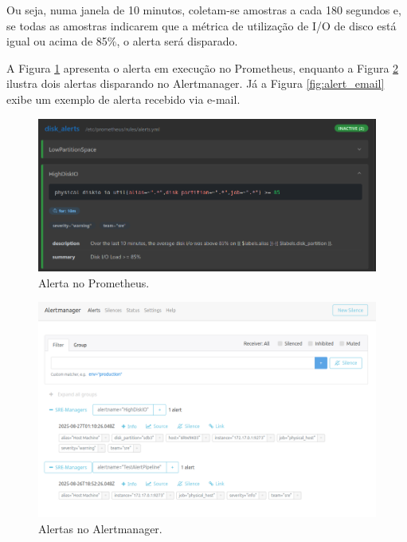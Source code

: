 {Ou seja, numa janela de 10 minutos, coletam-se amostras a cada 180 segundos e, se todas as amostras indicarem que a métrica de utilização de I/O de disco está igual ou acima de 85\%, o alerta será disparado.

A Figura \ref{fig:alert_prometheus} apresenta o alerta em execução no Prometheus, enquanto a Figura \ref{fig:alert_alertmanager} ilustra dois alertas disparando no Alertmanager. Já a Figura \ref{fig:alert_email} exibe um exemplo de alerta recebido via e-mail. 
\begin{figure}[H]
\centering
\color{red}
\setlength{\abovecaptionskip}{-20pt}
\includegraphics[width=\textwidth]{Imagens/chap04/alerts/alert_prometheus.png}
\caption{Alerta no Prometheus.}
\label{fig:alert_prometheus}
\end{figure}

\begin{figure}[H]
\centering
\color{red}
\setlength{\abovecaptionskip}{-20pt}
\includegraphics[width=\textwidth]{Imagens/chap04/alerts/alert_alertmanager.png}
\caption{Alertas no Alertmanager.}
\label{fig:alert_alertmanager}
\end{figure}

}
